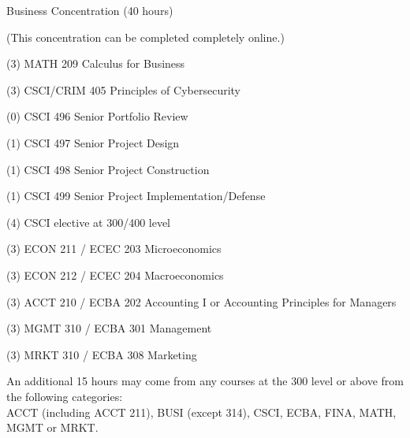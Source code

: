 \begin{reqgroup}{Business Concentration (40 hours)}
\begin{center}%
(This concentration can be completed completely online.)\vspace{-0.5em}%
\end{center}%
\begin{checklist}
\begin{minipage}[t]{0.5\linewidth}
	\item (3) MATH 209	Calculus for Business
	\item (3) CSCI/CRIM 405	Principles of Cybersecurity
	\item (0) CSCI 496	Senior Portfolio Review
	\item (1) CSCI 497	Senior Project Design
	\item (1) CSCI 498	Senior Project Construction
	\item (1) CSCI 499	Senior Project Implementation/Defense
	\item (4) CSCI elective at 300/400 level
\end{minipage}
\begin{minipage}[t]{0.5\linewidth}
	\item (3) ECON 211 / ECEC 203 Microeconomics
	\item (3) ECON 212 / ECEC 204 Macroeconomics
	\item (3) ACCT 210 / ECBA 202	Accounting I or Accounting Principles for Managers
	\item (3) MGMT 310 / ECBA 301	Management
	\item (3) MRKT 310 / ECBA 308	Marketing
\end{minipage}
\end{checklist}

\tcblower

An additional 15 hours may come from any courses at the 300 level or above from the following categories: \\ACCT (including ACCT 211), BUSI (except 314), CSCI, ECBA, FINA, MATH, MGMT or MRKT.
\begin{checklist}
\begin{minipage}[t]{0.5\linewidth}
	\blankReq
	\blankReq
	\blankReq
\end{minipage}
\begin{minipage}[t]{0.5\linewidth}
	\blankReq
	\blankReq
\end{minipage}
\end{checklist}
\end{reqgroup}

